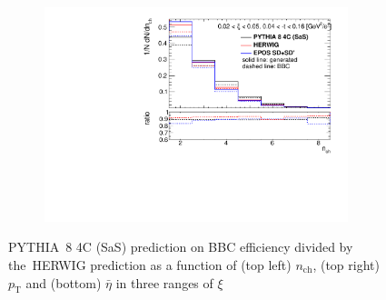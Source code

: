 \begin{figure}[H]
\begin{subfigure}{.49\textwidth}
		\includegraphics[width=0.97\textwidth,page=14]{chapters/chrgSTAR/img/bbcCorrection/xi_bbc.pdf}
	\end{subfigure}
	\hfill
	\begin{minipage}{.47\textwidth}
		\caption{PYTHIA~8 4C (SaS) prediction on BBC efficiency  divided by the~HERWIG prediction as a function of (top left) $n_\textrm{ch}$, (top right) $p_\textrm{T}$ and (bottom)  $\bar{\eta}$ in three ranges of $\xi$}
		\label{fig:bbcCorection_syst}
	\end{minipage}
\end{figure}

